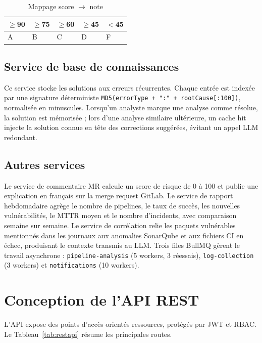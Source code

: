 \documentclass[12pt,a4paper,oneside]{report}
\begin{document}
\begin{table}[H]\centering
\caption{Mappage score $\rightarrow$ note}\label{tab:gradeMapping}
\renewcommand{\arraystretch}{1.2}
\begin{tabularx}{0.6\textwidth}{*{5}{>{\centering\arraybackslash}X}}
\toprule
\rowcolor{primarylight} $\geq$90 & $\geq$75 & $\geq$60 & $\geq$45 & $<$45 \\
\midrule
A & B & C & D & F \\
\bottomrule
\end{tabularx}
\end{table}

\subsection{Service de base de connaissances}
Ce service stocke les solutions aux erreurs récurrentes. Chaque entrée est indexée par une signature déterministe \texttt{MD5(errorType + ":" + rootCause[:100])}, normalisée en minuscules. Lorsqu'un analyste marque une analyse comme résolue, la solution est mémorisée ; lors d'une analyse similaire ultérieure, un cache hit injecte la solution connue en tête des corrections suggérées, évitant un appel LLM redondant.

\subsection{Autres services}\label{sec:otherservices}
Le service de commentaire MR calcule un score de risque de 0 à 100 et publie une explication en français sur la merge request GitLab. Le service de rapport hebdomadaire agrège le nombre de pipelines, le taux de succès, les nouvelles vulnérabilités, le MTTR moyen et le nombre d'incidents, avec comparaison semaine sur semaine. Le service de corrélation relie les paquets vulnérables mentionnés dans les journaux aux anomalies SonarQube et aux fichiers CI en échec, produisant le contexte transmis au LLM. Trois files BullMQ gèrent le travail asynchrone : \texttt{pipeline-analysis} (5 workers, 3 réessais), \texttt{log-collection} (3 workers) et \texttt{notifications} (10 workers).

\section{Conception de l'API REST}
L'API expose des points d'accès orientés ressources, protégés par JWT et RBAC. Le Tableau~\ref{tab:restapi} résume les principales routes.
\end{document}
